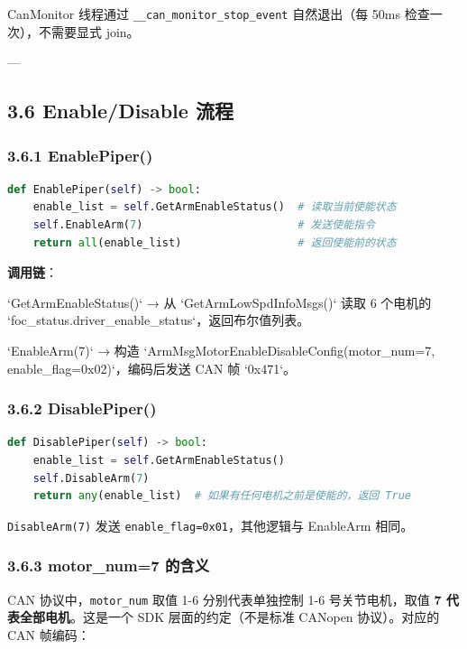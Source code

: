 \documentclass[UTF8,a4paper,11pt]{ctexart}
\begin{document}
CanMonitor 线程通过 \texttt{__can_monitor_stop_event} 自然退出（每 50ms 检查一次），不需要显式 join。

---

\subsection{3.6 Enable/Disable 流程}

\subsubsection{3.6.1 EnablePiper()}

\begin{lstlisting}[language=python]
def EnablePiper(self) -> bool:
    enable_list = self.GetArmEnableStatus()  # 读取当前使能状态
    self.EnableArm(7)                        # 发送使能指令
    return all(enable_list)                  # 返回使能前的状态
\end{lstlisting}

\textbf{调用链}：

\item[1] `GetArmEnableStatus()` → 从 `GetArmLowSpdInfoMsgs()` 读取 6 个电机的 `foc_status.driver_enable_status`，返回布尔值列表。
\item[2] `EnableArm(7)` → 构造 `ArmMsgMotorEnableDisableConfig(motor_num=7, enable_flag=0x02)`，编码后发送 CAN 帧 `0x471`。

\subsubsection{3.6.2 DisablePiper()}

\begin{lstlisting}[language=python]
def DisablePiper(self) -> bool:
    enable_list = self.GetArmEnableStatus()
    self.DisableArm(7)
    return any(enable_list)  # 如果有任何电机之前是使能的，返回 True
\end{lstlisting}

\texttt{DisableArm(7)} 发送 \texttt{enable_flag=0x01}，其他逻辑与 EnableArm 相同。

\subsubsection{3.6.3 motor_num=7 的含义}

CAN 协议中，\texttt{motor_num} 取值 1-6 分别代表单独控制 1-6 号关节电机，取值 \textbf{7 代表全部电机}。这是一个 SDK 层面的约定（不是标准 CANopen 协议）。对应的 CAN 帧编码：
\end{document}
